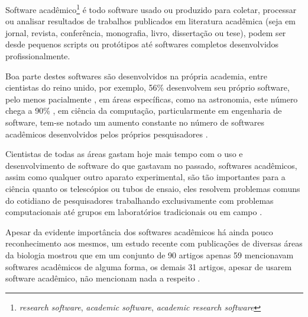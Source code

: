 

Software acadêmico\footnote{{\it research software}, {\it academic software},
{\it academic research software}} é todo software usado ou produzido para
coletar, processar ou analisar resultados de trabalhos publicados em literatura
acadêmica (seja em jornal, revista, conferência, monografia, livro, dissertação
ou tese), podem ser desde pequenos scripts ou protótipos até softwares
completos desenvolvidos profissionalmente.

Boa parte destes softwares são desenvolvidos na própria academia, entre
cientistas do reino unido, por exemplo, 56\% desenvolvem seu próprio software,
pelo menos pacialmente \cite{hettrick_2014_14809}, em áreas específicas, como
na astronomia, este número chega a 90\% \cite{momcheva2015software}, em ciência
da computação, particularmente em engenharia de software, tem-se notado um
aumento constante no número de softwares acadêmicos desenvolvidos pelos
próprios pesquisadores \cite{allen2017engineering}.

%
%

Cientistas de todas as áreas gastam hoje mais tempo com o uso e desenvolvimento
de software do que gastavam no passado, softwares
acadêmicos, assim como qualquer outro aparato experimental, são tão importantes
para a ciência quanto os telescópios ou tubos de ensaio, eles resolvem problemas
comuns do cotidiano de pesquisadores trabalhando exclusivamente com problemas computacionais até grupos em
laboratórios tradicionais ou em campo \cite{wilson2014best}.


Apesar da evidente importância dos softwares acadêmicos há ainda pouco
reconhecimento aos mesmos, um estudo recente com publicações de diversas áreas
da biologia mostrou que em um conjunto de 90 artigos apenas 59 mencionavam
softwares acadêmicos de alguma forma, os demais 31 artigos, apesar de usarem
software acadêmico, não mencionam nada a respeito \cite{howison2016software}.

